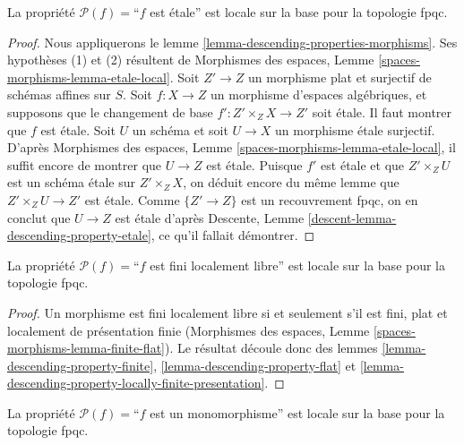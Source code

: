 \begin{lemma}
\label{lemma-descending-property-etale}
La propriété $\mathcal{P}(f) =$``$f$ est étale''
est locale sur la base pour la topologie fpqc.
\end{lemma}

\begin{proof}
Nous appliquerons le
lemme \ref{lemma-descending-properties-morphisms}.
Ses hypothèses (1) et (2) résultent de
Morphismes des espaces,
Lemme \ref{spaces-morphisms-lemma-etale-local}.
Soit $Z' \to Z$ un morphisme plat et surjectif de schémas affines sur $S$.
Soit $f : X \to Z$ un morphisme d'espaces algébriques, et supposons
que le changement de base $f' : Z' \times_Z X \to Z'$ soit étale.
Il faut montrer que $f$ est étale. Soit $U$ un schéma
et soit $U \to X$ un morphisme étale surjectif. D'après
Morphismes des espaces,
Lemme \ref{spaces-morphisms-lemma-etale-local},
il suffit encore de montrer que $U \to Z$ est étale.
Puisque $f'$ est étale et que $Z' \times_Z U$ est un
schéma étale sur $Z' \times_Z X$, on déduit encore du même lemme que
$Z' \times_Z U \to Z'$ est étale.
Comme $\{Z' \to Z\}$ est un recouvrement fpqc, on en conclut que
$U \to Z$ est étale d'après
Descente, Lemme \ref{descent-lemma-descending-property-etale},
ce qu'il fallait démontrer.
\end{proof}

\begin{lemma}
\label{lemma-descending-property-finite-locally-free}
La propriété $\mathcal{P}(f) =$``$f$ est fini localement libre''
est locale sur la base pour la topologie fpqc.
\end{lemma}

\begin{proof}
Un morphisme est fini localement libre si et seulement s'il est
fini, plat et localement de présentation finie
(Morphismes des espaces, Lemme \ref{spaces-morphisms-lemma-finite-flat}).
Le résultat découle donc des lemmes
\ref{lemma-descending-property-finite},
\ref{lemma-descending-property-flat} et
\ref{lemma-descending-property-locally-finite-presentation}.
\end{proof}

\begin{lemma}
\label{lemma-descending-property-monomorphism}
La propriété $\mathcal{P}(f) =$``$f$ est un monomorphisme''
est locale sur la base pour la topologie fpqc.
\end{lemma}

